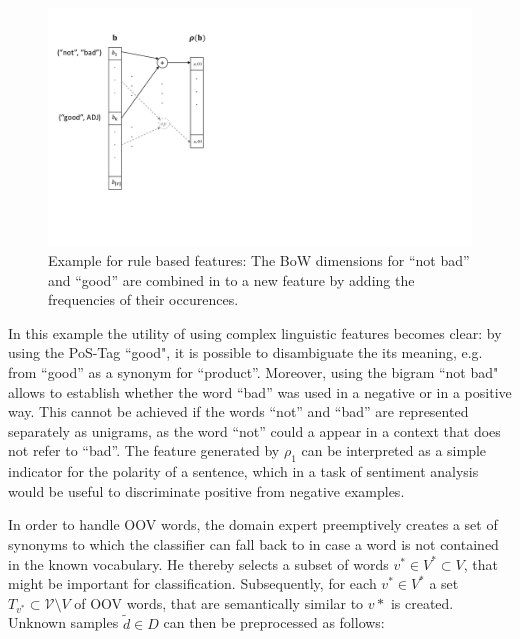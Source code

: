 \begin{figure}[htp]
\begin{center}
  \includegraphics[trim= 0 45.94mm 210mm 21mm, clip, scale=0.5]{img/rho}
  \caption[Example for rule based features]{Example for rule based features:
  The BoW dimensions for ``not bad'' and ``good'' are combined in to a new
  feature by adding the frequencies of their occurences.}
  \label{fig:rho}
\end{center}
\end{figure}

In this example the utility of using complex linguistic features becomes
 clear: by using the PoS-Tag ``good", it is possible to disambiguate the
its meaning, e.g. from ``good'' as a synonym for ``product''. Moreover,
using the bigram ``not bad" allows to establish whether the word ``bad'' was
used in a negative or in a positive way. This cannot be achieved if the words ``not'' and ``bad'' are
represented separately as unigrams, as the word ``not'' could a
appear in a context that does not refer to ``bad''. The feature generated by
$\rho_1$ can be interpreted as a simple indicator for the polarity of a
sentence, which in a task of sentiment analysis would be useful to discriminate
positive from negative examples.

In order to handle OOV words, the domain expert preemptively creates a
set of synonyms to which the classifier can fall back to in case a word is not contained
in the known vocabulary. He thereby selects a subset of words $v^* \in V^*
\subset V$, that might be important for classification. Subsequently,
for each $v^* \in V^*$ a set $T_{v^*} \subset \mathcal{V}\setminus V$ of OOV
words, that are semantically similar to $v*$ is created.  Unknown samples $\tilde{d} \in D$ can then be
preprocessed as follows:

